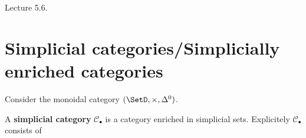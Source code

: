 Lecture 5.6.

\section{Simplicial categories/Simplicially enriched categories}

Consider the monoidal category $ ( \SetD , \times , \Delta^0 ) $.

\begin{defi}
	A \textbf{simplicial category} $ \mathcal{ C }_\bullet $ is a category enriched in simplicial sets.
	Explicitely $ \mathcal{ C }_\bullet $ consists of 
\end{defi}